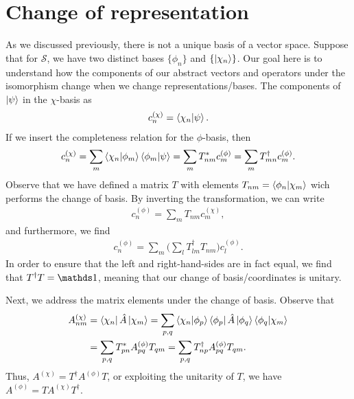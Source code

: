 \section{Change of representation}

As we discussed previously, there is not a unique basis of a vector space.
Suppose that for $\mathcal{S}$, we have two distinct bases $\{ \phi_{n} \}$ and $\{ \ket{\chi_{n}} \}$.
Our goal here is to understand how the components of our abstract vectors and operators under the isomorphism change when we change representations/bases.
The components of $\ket{\psi}$ in the $\chi$-basis as
\begin{eqnarray}
    c_{n}^{(\chi)} = \bra{\chi_{n}}\ket{\psi}
.\end{eqnarray}
If we insert the completeness relation for the $\phi$-basis, then
\begin{eqnarray}
    c_{n}^{(\chi)} = \sum_{m} \bra{\chi_{n}}\ket{\phi_{m}} \bra{\phi_{m}}\ket{\psi} = \sum_{m} T_{nm}^{*} c_{m}^{(\phi)} = \sum_{m} T_{mn}^{\dagger} c_{m}^{(\phi)}
.\end{eqnarray}
Observe that we have defined a matrix $T$ with elements $T_{nm} = \bra{\phi_{n}}\ket{\chi_{m}}$ wich performs the change of basis.
By inverting the transformation, we can write
\begin{eqnarray}
    c_{n}^{(\phi)} = \sum_{m} T_{nm} c_{m}^{(\chi)}
,\end{eqnarray}
and furthermore, we find
\begin{eqnarray}
    c_{n}^{(\phi)} = \sum_{m} \Big( \sum_{l} T_{lm}^{\dagger} T_{nm} \Big) c_{l}^{(\phi)}
.\end{eqnarray}
In order to ensure that the left and right-hand-sides are in fact equal, we find that $T^{\dagger} T = \id$, meaning that our change of basis/coordinates is unitary.

Next, we address the matrix elements under the change of basis.
Observe that
\begin{align}
    A_{nm}^{(\chi)} &= \bra{\chi_{n}} \hat{A} \ket{\chi_{m}} = \sum_{p,q} \bra{\chi_{n}} \ket{\phi_{p}} \bra{\phi_{p}} \hat{A} \ket{\phi_{q}} \bra{\phi_{q}} \ket{\chi_{m}} \nonumber \\
                    &= \sum_{p,q} T_{pn}^{*} A^{(\phi)}_{pq} T_{qm} = \sum_{p,q} T_{np}^{\dagger} A^{(\phi)}_{pq} T_{qm}
.\end{align}
Thus, $A^{(\chi)} = T^{\dagger} A^{(\phi)} T$, or exploiting the unitarity of $T$, we have $A^{(\phi)} = T A^{(\chi)} T^{\dagger}$.



